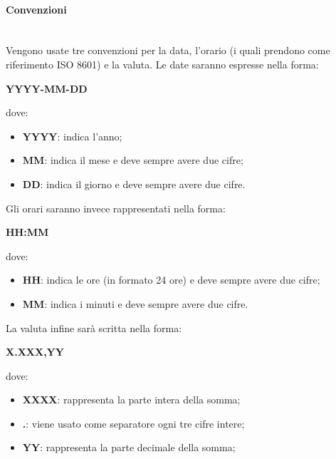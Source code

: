                 \paragraph{Convenzioni}\mbox{}\\ [1mm]
                    Vengono usate tre convenzioni per la data, l'orario (i quali prendono come riferimento ISO 8601) e la valuta. Le date saranno espresse nella forma: \newline \newline
                    \centerline{\textbf{YYYY-MM-DD}} \newline \newline
                    dove:
                    \begin{itemize}
                        \item \textbf{YYYY}: indica l'anno;
                        \item \textbf{MM}: indica il mese e deve sempre avere due cifre;
                        \item \textbf{DD}: indica il giorno e deve sempre avere due cifre.
                    \end{itemize}
                    Gli orari saranno invece rappresentati nella forma: \newline \newline
                    \centerline{\textbf{HH:MM}} \newline \newline
                    dove:
                    \begin{itemize}
                        \item \textbf{HH}: indica le ore (in formato 24 ore) e deve sempre avere due cifre;
                        \item \textbf{MM}: indica i minuti e deve sempre avere due cifre.
                    \end{itemize}
                    La valuta infine sarà scritta nella forma: \newline \newline
                    \centerline{\textbf{X.XXX,YY}} \newline \newline
                    dove:
                    \begin{itemize}
                        \item \textbf{XXXX}: rappresenta la parte intera della somma;
                        \item \textbf{.}: viene usato come separatore ogni tre cifre intere;
                        \item \textbf{YY}: rappresenta la parte decimale della somma;
                    \end{itemize}
